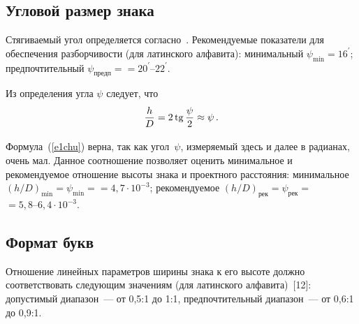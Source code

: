 \begin{multicols}{2}
\subsection{Угловой размер знака} %

     Стягиваемый угол определяется согласно~\cite{10chu, 15chu}. 
Рекомендуемые показатели для обеспечения разборчивости (для латинского алфавита):
минимальный $\psi_{\min} =16^\prime$; предпочтительный $\psi_{\mathrm{предп}}=$\linebreak $=20^\prime\mbox{--}22^\prime$.

     Из определения угла $\psi$ следует, что
     \begin{equation}
     \displaystyle\frac{\displaystyle h\mathstrut}{\displaystyle D\mathstrut}=2\,\mathrm{tg}\,\displaystyle\frac{\displaystyle \psi\mathstrut}{\displaystyle 2\mathstrut}\approx \psi\,.
     \label{e1chu}
     \end{equation}
     
     Формула~(\ref{e1chu}) верна, так как угол~$\psi$, измеряемый здесь и 
далее в радианах, очень мал. Данное соотношение позволяет оценить 
минимальное и рекомендуемое отношение высоты знака и проектного 
расстояния:
минимальное $(h/D)_{\min}=\psi_{\min}=$\linebreak $= 4{,}7\cdot 10^{-3}$;
рекомендуемое $(h/D)_{\mathrm{рек}}=\psi_{\mathrm{рек}}=$\linebreak $= 5{,}8\mbox{--}6{,}4\cdot 10^{-3}$.

\subsection{Формат букв} %

     Отношение линейных параметров ширины знака к его высоте должно 
соответствовать следующим значениям (для латинского алфавита)~[12]:
допустимый диапазон~--- от 0,5:1 до 1:1,  
предпочтительный диапазон~--- от 0,6:1 до 0,9:1.





\end{multicols}
